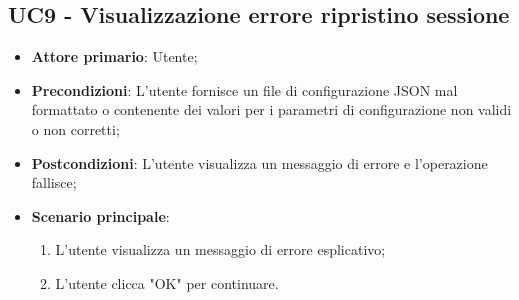 \subsection{UC9 - Visualizzazione errore ripristino sessione}
\begin{itemize}
	\item \textbf{Attore primario}: Utente;
	\item \textbf{Precondizioni}: L'utente fornisce un file di configurazione JSON mal formattato o contenente dei valori per i parametri di configurazione non validi o non corretti;
	\item \textbf{Postcondizioni}: L'utente visualizza un messaggio di errore e l'operazione fallisce;
	\item \textbf{Scenario principale}:
		\begin{enumerate}
			\item L'utente visualizza un messaggio di errore esplicativo;
			\item L'utente clicca "OK" per continuare.
		\end{enumerate}
\end{itemize}